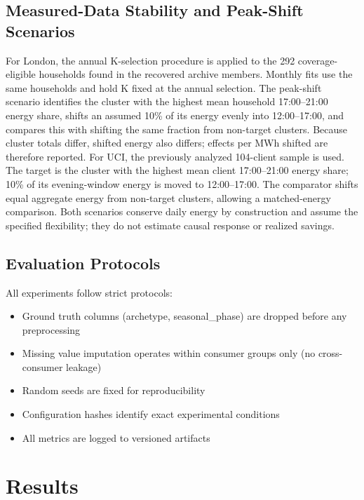 \documentclass[11pt,a4paper]{article}
\begin{document}
\subsection{Measured-Data Stability and Peak-Shift Scenarios}

For London, the annual K-selection procedure is applied to the 292 coverage-eligible households found in the recovered archive members. Monthly fits use the same households and hold K fixed at the annual selection. The peak-shift scenario identifies the cluster with the highest mean household 17:00--21:00 energy share, shifts an assumed 10\% of its energy evenly into 12:00--17:00, and compares this with shifting the same fraction from non-target clusters. Because cluster totals differ, shifted energy also differs; effects per MWh shifted are therefore reported. For UCI, the previously analyzed 104-client sample is used. The target is the cluster with the highest mean client 17:00--21:00 energy share; 10\% of its evening-window energy is moved to 12:00--17:00. The comparator shifts equal aggregate energy from non-target clusters, allowing a matched-energy comparison. Both scenarios conserve daily energy by construction and assume the specified flexibility; they do not estimate causal response or realized savings.

\subsection{Evaluation Protocols}

All experiments follow strict protocols:

\begin{itemize}
    \item Ground truth columns (archetype, seasonal\_phase) are dropped before any preprocessing
    \item Missing value imputation operates within consumer groups only (no cross-consumer leakage)
    \item Random seeds are fixed for reproducibility
    \item Configuration hashes identify exact experimental conditions
    \item All metrics are logged to versioned artifacts
\end{itemize}

\section{Results}
\label{sec:results}
\end{document}
